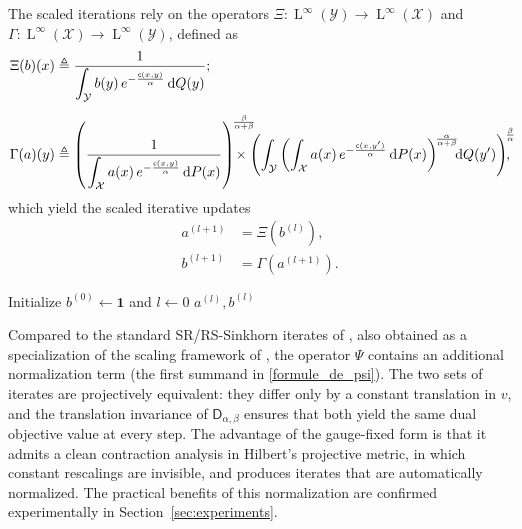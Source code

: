 \documentclass{article}
\begin{document}
The scaled iterations rely on the operators $\Xi : \operatorname{L}^\infty(\mathcal{Y}) \to \operatorname{L}^\infty(\mathcal{X})$ and $\Gamma : \operatorname{L}^\infty(\mathcal{X}) \to \operatorname{L}^\infty(\mathcal{Y})$, defined as
\begin{align}
  \label{formule_xi}
  \Xi(b)(x) &\triangleq
  \frac{1}{\displaystyle\int_{\mathcal{Y}}
    b(y)\,e^{-\frac{\mathsf{c}(x,y)}{\alpha}}\,\mathrm{d}Q(y)};
  \\[6pt]
  \label{formule_gamma}
  \Gamma(a)(y) &\triangleq
  \left(
    \frac{1}{\displaystyle\int_{\mathcal{X}}
      a(x)\,e^{-\frac{\mathsf{c}(x,y)}{\alpha}}\,\mathrm{d}P(x)}
  \right)^{\!\frac{\beta}{\alpha+\beta}} \hspace{-3.5ex}
  \!\times
  \left(
    \int_{\mathcal{Y}}
    \left(
      \int_{\mathcal{X}}
      a(x)\,e^{-\frac{\mathsf{c}(x,y')}{\alpha}}\,\mathrm{d}P(x)
    \right)^{\!\frac{\alpha}{\alpha+\beta}} \hspace{-1ex}
    \mathrm{d}Q(y')
  \right)^{\!\frac{\beta}{\alpha}}\hspace{-2ex},
\end{align}
which yield the scaled iterative updates
\begin{subequations}
  \label{equations_algo_2}
  \begin{align}
    \label{scaled_update_1}
    a^{(l+1)} &= \Xi\!\left(b^{(l)}\right), \\
    \label{scaled_update_2}
    b^{(l+1)} &= \Gamma\!\left(a^{(l+1)}\right).
  \end{align}
\end{subequations}

\begin{algorithm}[ht]
  \caption{Gauge-Fixed Sinkhorn (scaled)}
  \label{algo_2_scaled}
  Initialize $b^{(0)} \gets \mathbf{1}$ and $l \gets 0$\;
  \Return $a^{(l)}, b^{(l)}$\;
\end{algorithm}
Compared to the standard SR/RS-Sinkhorn iterates of \cite{le2021robust, fukunaga2022convergence}, also obtained as a specialization of the scaling framework of \cite[Equation~3.6]{chizat2018scaling}, the operator $\Psi$ contains an additional normalization term (the first summand in \eqref{formule_de_psi}). The two sets of iterates are projectively equivalent: they differ only by a constant translation in $v$, and the translation invariance of $\mathsf{D}_{\alpha,\beta}$ ensures that both yield the same dual objective value at every step. The advantage of the gauge-fixed form is that it admits a clean contraction analysis in Hilbert's projective metric, in which constant rescalings are invisible, and produces iterates that are automatically normalized. The practical benefits of this normalization are confirmed experimentally in Section~\ref{sec:experiments}.
\end{document}
